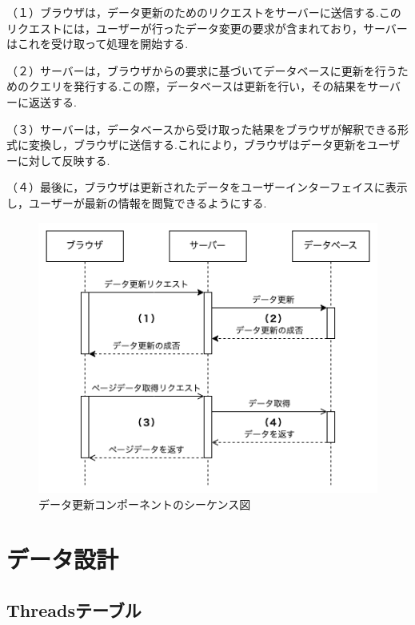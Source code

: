 \documentclass[b5paper,12pt,dvipdfmx]{jsreport}
\begin{document}
（１）ブラウザは，データ更新のためのリクエストをサーバーに送信する.このリクエストには，ユーザーが行ったデータ変更の要求が含まれており，サーバーはこれを受け取って処理を開始する.

（２）サーバーは，ブラウザからの要求に基づいてデータベースに更新を行うためのクエリを発行する.この際，データベースは更新を行い，その結果をサーバーに返送する.

（３）サーバーは，データベースから受け取った結果をブラウザが解釈できる形式に変換し，ブラウザに送信する.これにより，ブラウザはデータ更新をユーザーに対して反映する.

（４）最後に，ブラウザは更新されたデータをユーザーインターフェイスに表示し，ユーザーが最新の情報を閲覧できるようにする.


\begin{figure}[H]
    \centering
    \includegraphics[width=\textwidth]{./img/components/data_update_component_sequence_diagram.png}
    \caption{データ更新コンポーネントのシーケンス図}
    \label{data_update_component_sequence_diagram}
\end{figure}


\section{データ設計}

\subsection*{Threadsテーブル}
\end{document}
